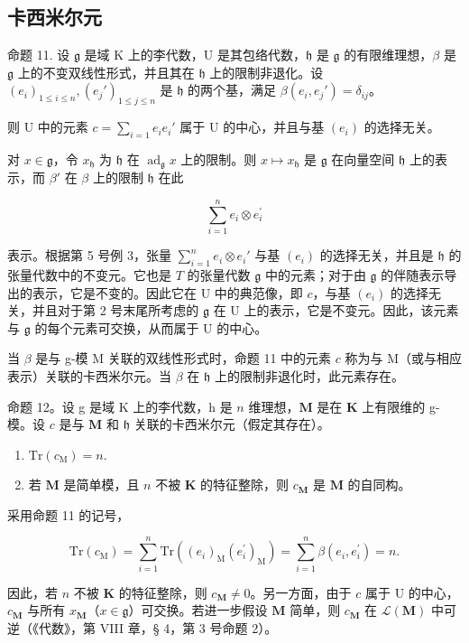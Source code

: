 \subsection{卡西米尔元}

命题 11. 设 \(\mathfrak{g}\) 是域 K 上的李代数，U 是其包络代数，\(\mathfrak{h}\) 是 \(\mathfrak{g}\) 的有限维理想，\(\beta\) 是 \(\mathfrak{g}\) 上的不变双线性形式，并且其在 \(\mathfrak{h}\) 上的限制非退化。设 \((e_i)_{1\leqslant i\leqslant n}, (e_j')_{1\leqslant j\leqslant n}\) 是 \(\mathfrak{h}\) 的两个基，满足 \(\beta(e_i,e_j') = \delta_{ij}\)。

则 U 中的元素 \(c = \sum_{i=1} e_i e_i'\) 属于 U 的中心，并且与基 \((e_i)\) 的选择无关。

对 \(x \in \mathfrak{g}\)，令 \(x_{\mathfrak{h}}\) 为 \(\mathfrak{h}\) 在 \(\operatorname{ad}_{\mathfrak{g}} x\) 上的限制。则 \(x \mapsto x_{\mathfrak{h}}\) 是 \(\mathfrak{g}\) 在向量空间 \(\mathfrak{h}\) 上的表示，而 \(\beta'\) 在 \(\beta\) 上的限制 \(\mathfrak{h}\) 在此

\[
\sum_ {i = 1} ^ {n} e _ {i} \otimes e _ {i} ^ {\prime}
\]

 表示。根据第 5 号例 3，张量 \(\sum_{i=1}^{n} e_i \otimes e_i'\) 与基 \((e_i)\) 的选择无关，并且是 \(\mathfrak{h}\) 的张量代数中的不变元。它也是 \(T\) 的张量代数 \(\mathfrak{g}\) 中的元素；对于由 \(\mathfrak{g}\) 的伴随表示导出的表示，它是不变的。因此它在 U 中的典范像，即 \(c\)，与基 \((e_i)\) 的选择无关，并且对于第 2 号末尾所考虑的 \(\mathfrak{g}\) 在 U 上的表示，它是不变元。因此，该元素与 \(\mathfrak{g}\) 的每个元素可交换，从而属于 U 的中心。

当 \(\beta\) 是与 g-模 M 关联的双线性形式时，命题 11 中的元素 \(c\) 称为与 M（或与相应表示）关联的卡西米尔元。当 \(\beta\) 在 \(\mathfrak{h}\) 上的限制非退化时，此元素存在。

命题 12。设 g 是域 K 上的李代数，h 是 \(n\) 维理想，\(\mathbf{M}\) 是在 \(\mathbf{K}\) 上有限维的 g-模。设 \(c\) 是与 \(\mathbf{M}\) 和 \(\mathfrak{h}\) 关联的卡西米尔元（假定其存在）。

\begin{enumerate}
\def\labelenumi{(\alph{enumi})}
\item
  \(\mathrm{Tr}(c_{\mathrm{M}})=n.\)
\item
  若 \(\mathbf{M}\) 是简单模，且 \(n\) 不被 \(\mathbf{K}\) 的特征整除，则 \(c_{\mathbf{M}}\) 是 \(\mathbf{M}\) 的自同构。
\end{enumerate}

采用命题 11 的记号，

\[
\mathrm{Tr} (c _ {\mathrm{M}}) = \sum_ {i = 1} ^ {n} \mathrm{Tr} ((e _ {i}) _ {\mathrm{M}} (e _ {i} ^ {\prime}) _ {\mathrm{M}}) = \sum_ {i = 1} ^ {n} \beta (e _ {i}, e _ {i} ^ {\prime}) = n.
\]

因此，若 \(n\) 不被 \(\mathbf{K}\) 的特征整除，则 \(c_{\mathbf{M}} \neq 0\)。另一方面，由于 \(c\) 属于 \(\mathrm{U}\) 的中心，\(c_{\mathbf{M}}\) 与所有 \(x_{\mathbf{M}}\)（\(x \in \mathfrak{g}\)）可交换。若进一步假设 \(\mathbf{M}\) 简单，则 \(c_{\mathbf{M}}\) 在 \(\mathcal{L}(\mathbf{M})\) 中可逆（《代数》，第 VIII 章，§ 4，第 3 号命题 2）。


